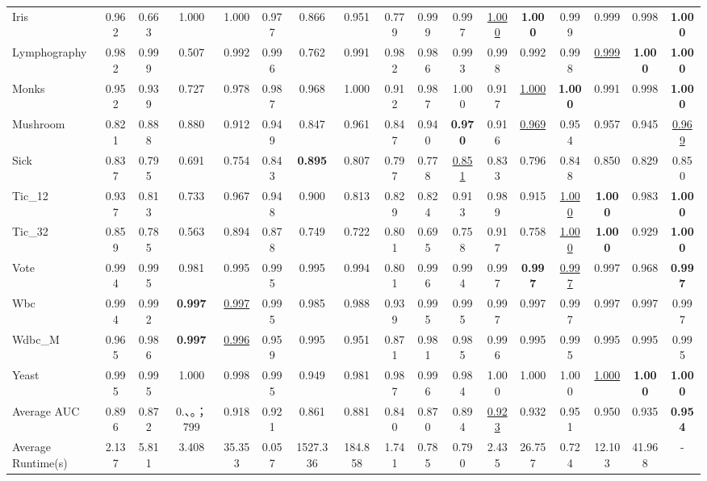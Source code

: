 \documentclass[ASNA,twocolumn]{USG} %
\begin{document}
\begin{table}[!ht]
{\begin{tabular}{lccccccccccc|cccc|c}
            Iris & 0.962 & 0.663 & 1.000 & 1.000 & 0.977 & 0.866 & 0.951 & 0.779 & 0.999 & 0.997 & \underline{1.000} & \textbf{1.000} & 0.999 & 0.999 & 0.998 & \textbf{1.000} \\
            Lymphography & 0.982 & 0.999 & 0.507 & 0.992 & 0.996 & 0.762 & 0.991 & 0.982 & 0.986 & 0.993 & 0.998 & 0.992 & 0.998 & \underline{0.999} & \textbf{1.000} & \textbf{1.000} \\
            Monks & 0.952 & 0.939 & 0.727 & 0.978 & 0.987 & 0.968 & 1.000 & 0.912 & 0.987 & 1.000 & 0.917 & \underline{1.000} & \textbf{1.000} & 0.991 & 0.998 & \textbf{1.000} \\
            Mushroom & 0.821 & 0.888 & 0.880 & 0.912 & 0.949 & 0.847 & 0.961 & 0.847 & 0.940 & \textbf{0.970} & 0.916 & \underline{0.969} & 0.954 & 0.957 & 0.945 & \underline{0.969} \\
            Sick & 0.837 & 0.795 & 0.691 & 0.754 & 0.843 & \textbf{0.895} & 0.807 & 0.797 & 0.778 & \underline{0.851} & 0.833 & 0.796 & 0.848 & 0.850 & 0.829 & 0.850 \\
            Tic\_12 & 0.937 & 0.813 & 0.733 & 0.967 & 0.948 & 0.900 & 0.813 & 0.829 & 0.824 & 0.913 & 0.989 & 0.915 & \underline{1.000} & \textbf{1.000} & 0.983 & \textbf{1.000} \\
            Tic\_32 & 0.859 & 0.785 & 0.563 & 0.894 & 0.878 & 0.749 & 0.722 & 0.801 & 0.695 & 0.758 & 0.917 & 0.758 & \underline{1.000} & \textbf{1.000} & 0.929 & \textbf{1.000} \\
            Vote & 0.994 & 0.995 & 0.981 & 0.995 & 0.995 & 0.995 & 0.994 & 0.801 & 0.996 & 0.994 & 0.997 & \textbf{0.997} & \underline{0.997} & 0.997 & 0.968 & \textbf{0.997} \\
            Wbc & 0.994 & 0.992 & \textbf{0.997} & \underline{0.997} & 0.995 & 0.985 & 0.988 & 0.939 & 0.995 & 0.995 & 0.997 & 0.997 & 0.997 & 0.997 & 0.997 & 0.997 \\
            Wdbc\_M & 0.965 & 0.986 & \textbf{0.997} & \underline{0.996} & 0.959 & 0.995 & 0.951 & 0.871 & 0.981 & 0.985 & 0.996 & 0.995 & 0.995 & 0.995 & 0.995 & 0.995 \\
            Yeast & 0.995 & 0.995 & 1.000 & 0.998 & 0.995 & 0.949 & 0.981 & 0.987 & 0.996 & 0.984 & 1.000 & 1.000 & 1.000 & \underline{1.000} & \textbf{1.000} & \textbf{1.000} \\
            \midrule
            Average AUC & 0.896 & 0.872 & 0.、。；799 & 0.918 & 0.921 & 0.861 & 0.881 & 0.840 & 0.870 & 0.894 & \underline{0.923} & 0.932 & 0.951 & 0.950 & 0.935 & \textbf{0.954} \\
            Average Runtime(s) & 2.137 & 5.811 & 3.408 & 35.353 & 0.057 & 1527.336 & 184.858 & 1.741 & 0.785 & 0.790 & 2.435 & 26.757 & 0.724 & 12.103 & 41.968 & - \\
            \bottomrule
        \end{tabular}}
\end{table}
\end{document}

